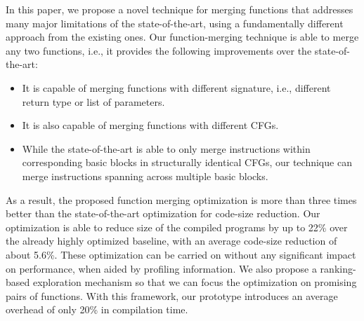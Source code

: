 In this paper, we propose a novel technique for merging functions
that addresses many major limitations of the state-of-the-art, using a
fundamentally different approach from the existing ones.
Our function-merging technique is able to merge any two functions, i.e., it
provides the following improvements over the state-of-the-art:
\begin{itemize}[noitemsep,topsep=0pt]
  \item It is capable of merging functions with different signature, i.e.,
  different return type or list of parameters.
  \item It is also capable of merging functions with different CFGs.
  \item While the state-of-the-art is able to only merge instructions within
  corresponding basic blocks in structurally identical CFGs,
  our technique can merge instructions spanning across multiple basic blocks.
\end{itemize}
As a result, the proposed function merging optimization is
more than three times better than the state-of-the-art optimization for
code-size reduction.
Our optimization is able to reduce size of the compiled programs by up to
22\% over the already highly optimized baseline, with an average code-size
reduction of about 5.6\%.
These optimization can be carried on without any significant impact on
performance, when aided by profiling information.
We also propose a ranking-based exploration mechanism so that we can focus
the optimization on promising pairs of functions.
With this framework, our prototype introduces an average overhead of only 20\%
in compilation time.





